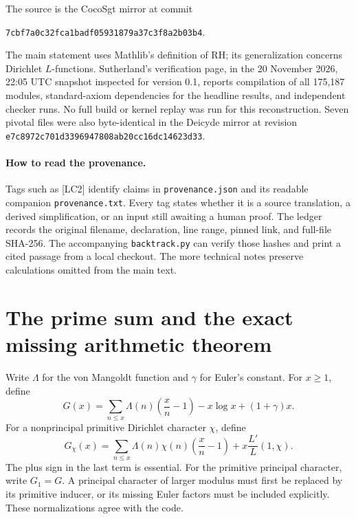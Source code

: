 \documentclass[11pt,a4paper]{article}
\numberwithin{equation}{section}
\theoremstyle{remark}\newtheorem{remark}[theorem]{Remark}
\begin{document}
The source is the CocoSgt mirror at commit
\begin{center}\small\texttt{7cbf7a0c32fca1badf05931879a37c3f8a2b03b4}.\end{center}
The main statement uses Mathlib's definition of RH; its generalization concerns Dirichlet $L$-functions. Sutherland's verification page, in the 20 November 2026, 22:05 UTC snapshot inspected for version 0.1, reports compilation of all 175,187 modules, standard-axiom dependencies for the headline results, and independent checker runs. No full build or kernel replay was run for this reconstruction. Seven pivotal files were also byte-identical in the Deicyde mirror at revision \texttt{e7c8972c701d3396947808ab20cc16dc14623d33}.\cite{verification,main}

\paragraph{How to read the provenance.}
Tags such as \textsf{[LC2]} identify claims in \texttt{provenance.json} and its readable companion \texttt{provenance.txt}. Every tag states whether it is a source translation, a derived simplification, or an input still awaiting a human proof. The ledger records the original filename, declaration, line range, pinned link, and full-file SHA-256. The accompanying \texttt{backtrack.py} can verify those hashes and print a cited passage from a local checkout. The more technical notes preserve calculations omitted from the main text.

\section{The prime sum and the exact missing arithmetic theorem}

Write $\Lambda$ for the von Mangoldt function and $\gamma$ for Euler's constant. For $x\ge1$, define
\begin{equation}\label{eq:G}
G(x)=\sum_{n\le x}\Lambda(n)\left(\frac{x}{n}-1\right)
       -x\log x+(1+\gamma)x.
\end{equation}
For a nonprincipal primitive Dirichlet character $\chi$, define
\begin{equation}\label{eq:Gchi}
G_\chi(x)=\sum_{n\le x}\Lambda(n)\chi(n)\left(\frac{x}{n}-1\right)
                  +x\frac{L'}{L}(1,\chi).
\end{equation}
The plus sign in the last term is essential. For the primitive principal character, write $G_1=G$. A principal character of larger modulus must first be replaced by its primitive inducer, or its missing Euler factors must be included explicitly. These normalizations agree with the code.\cite{charfamily,level}
\end{document}
